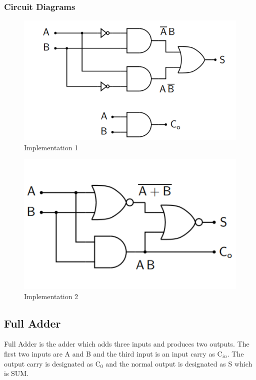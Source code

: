 \documentclass{report}
\begin{document}
\subsubsection{Circuit Diagrams}
\begin{figure}[h]
    \centering
    \includegraphics[scale=0.5]{impli1.png}
    \caption{Implementation 1}
    \label{fig:my_label}
\end{figure} 
\begin{figure}[h]
    \centering
    \includegraphics[scale=0.5]{impli2.png}
    \caption{Implementation 2}
    \label{fig:my_label}
\end{figure} 

\subsection{Full Adder}
Full Adder is the adder which adds three inputs and produces two outputs. The first two inputs are A and B and the third input is an input carry as C$_{in}$. The output carry is designated as C$_0$ and the normal output is designated as S which is SUM.
\end{document}
